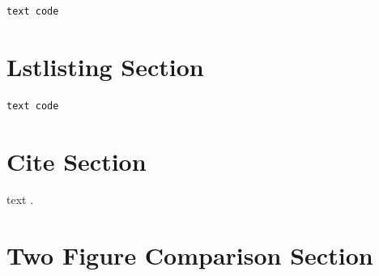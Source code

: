 \begin{verbatim}
text code
\end{verbatim}


\section{Lstlisting Section}

\begin{lstlisting}[language=bash, frame=single]
text code
\end{lstlisting}


\section{Cite Section}

text \cite{name1}.


\section{Two Figure Comparison Section}

